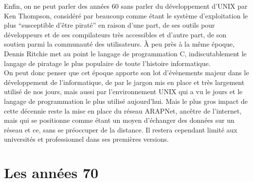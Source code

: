 \documentclass[a4paper]{memoir}
\begin{document}
Enfin, on ne peut parler des années 60 sans parler du développement d'UNIX par Ken Thompson, considéré par beaucoup comme étant le système d'exploitation le plus ``susceptible d'être piraté'' en raison d'une part, de ses outils pour développeurs et de ses compilateurs très accessibles et d'autre part, de son soutien parmi la communauté des utilisateurs. À peu près à la même époque, Dennis Ritchie met au point le langage de programmation C, indiscutablement le langage de piratage le plus populaire de toute l'histoire informatique.\\

On peut donc penser que cet époque apporte son lot d'évènements majeur dans le développement de l'informatique, de par le jargon mis en place et très largement utilisé de nos jours, mais aussi par l'environnement UNIX qui a vu le jours et le langage de programmation le plus utilisé aujourd'hui. Mais le plus gros impact de cette décennie reste la mise en place du réseau ARAPNet, ancêtre de l'internet, mais qui se positionne comme étant un moyen d'échanger des données sur un réseau et ce, sans se préoccuper de la distance. Il restera cependant limité aux universités et professionnel dans ses premières versions.

\section{Les années 70}
\end{document}
